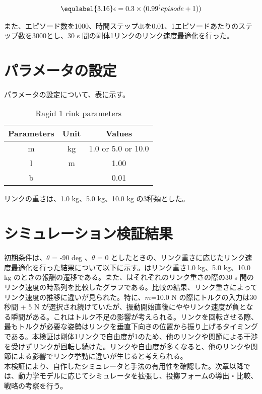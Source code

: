 \begin{eqnarray}
  \equlabel{3.16}
  \epsilon = 0.3 \times ({0.99}^(episode + 1))
\end{eqnarray}

また、エピソード数を1000、時間ステップdtを0.01、1エピソードあたりのステップ数を3000とし、30 s 間の剛体1リンクのリンク速度最適化を行った。
\section{パラメータの設定}
パラメータの設定について、表に示す。
\begin{table}[tb]
  \begin{center}
    \caption{Ragid 1 rink parameters}
    \begin{tabular}{c|c|c}
      \hline
      Parameters & Unit & Values \\
      \hline
      m & kg & 1.0 or 5.0 or 10.0\\
      l & m & 1.00 \\
      b &  & 0.01 \\
      \hline
    \end{tabular}
  \end{center}
\end{table}
リンクの重さは、1.0 kg、5.0 kg、10.0 kg の3種類とした。
\section{シミュレーション検証結果}
初期条件は、$\theta$ = -90 deg 、$\dot{\theta}$ = 0 としたときの、リンク重さに応じたリンク速度最適化を行った結果について以下に示す。はリンク重さ1.0 kg、5.0 kg、10.0 kg のときの報酬の遷移である。また、はそれぞれのリンク重さの際の30 s 間のリンク速度の時系列を比較したグラフである。比較の結果、リンク重さによってリンク速度の推移に違いが見られた。特に、$m$=10.0 N の際にトルクの入力は30秒間 + 5 N が選択され続けていたが、振動開始直後にややリンク速度が負となる瞬間がある。これはトルク不足の影響が考えられる。リンクを回転させる際、最もトルクが必要な姿勢はリンクを垂直下向きの位置から振り上げるタイミングである。本検証は剛体1リンクで自由度が1のため、他のリンクや関節による干渉を受けずリンクが回転し続けた。リンクや自由度が多くなると、他のリンクや関節による影響でリンク挙動に違いが生じると考えられる。\\
本検証により、自作したシミュレータと手法の有用性を確認した。次章以降では、動力学モデルに応じてシミュレータを拡張し、投擲フォームの導出・比較、戦略の考察を行う。

